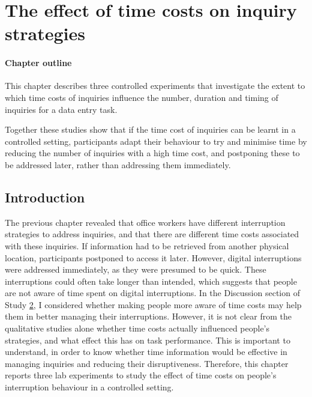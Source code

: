\chapter{The effect of time costs on inquiry strategies}\label{ch:34}

\begin{mynote}
\subsubsection{Chapter outline}
This chapter describes three controlled experiments that investigate the extent to which time costs of inquiries influence the number, duration and timing of inquiries for a data entry task. 


Together these studies show that if the time cost of inquiries can be learnt in a controlled setting, participants adapt their behaviour to try and minimise time by reducing the number of inquiries with a high time cost, and postponing these to be addressed later, rather than addressing them immediately. 

\end{mynote}
 
 \section{Introduction}
The previous chapter revealed that office workers have different interruption strategies to address inquiries, and that there are different time costs associated with these inquiries. If information had to be retrieved from another physical location, participants postponed to access it later. However, digital interruptions were addressed immediately, as they were presumed to be quick. These interruptions could often take longer than intended, which suggests that people are not aware of time spent on digital interruptions. In the Discussion section of Study \hyperref[st:Study2]{2}, I considered whether making people more aware of time costs may help them in better managing their interruptions. However, it is not clear from the qualitative studies alone whether time costs actually influenced people's strategies, and what effect this has on task performance. This is important to understand, in order to know whether time information would be effective in managing inquiries and reducing their disruptiveness. Therefore, this chapter reports three lab experiments to study the effect of time costs on people's interruption behaviour in a controlled setting.

